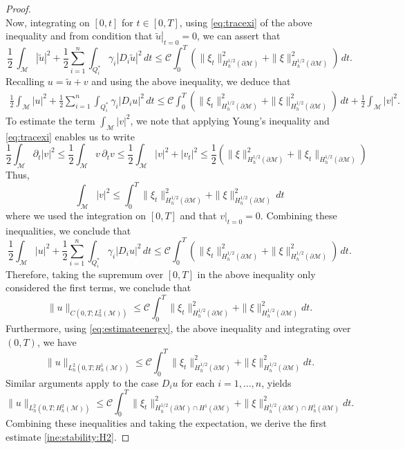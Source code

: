 \documentclass[10pt,a4paper]{amsart}
\begin{document}
\begin{proof}
\[\]
Now, integrating on $[0,t]$ for $t\in [0,T]$, using \eqref{eq:tracexi} of the above inequality and from condition that $\left.\tilde{u}\right|_{t=0}=0$, we can assert that
\begin{equation}\label{eqE}
    \frac{1}{2} \, \int_{\mathcal{M}}|\tilde{u}|^2+ \frac{1}{2}\sum_{i=1}^{n}\int_{Q_i^{*}} \gamma_i|D_i\tilde{u}|^2\, dt \leq \mathcal{C}\int_{0}^{T}\left(\|\xi_t\|^2_{ H_h^{1/2}(\partial \mathcal{M})}+\|\xi\|^2_{H_h^{1/2}(\partial \mathcal{M})}\right)\, dt.
\end{equation}
Recalling $u = \tilde{u} + v$ and using the above inequality, we deduce that
\[
\begin{aligned}
\frac{1}{2}\int_{\mathcal{M}}|u|^2+\frac{1}{2}\sum_{i=1}^{n}\int_{Q_i^{*}}\gamma_i|D_iu|^2\,dt\leq \mathcal{C}\int_{0}^{T}\left(\|\xi_t\|^2_{ H_h^{1/2}(\partial \mathcal{M})}+\|\xi\|^2_{H_h^{1/2}(\partial \mathcal{M})}\right)\, dt+\frac{1}{2}\int_{\mathcal{M}}|v|^2.
\end{aligned}
\]
To estimate the term $\displaystyle \int_{\mathcal{M}}|v|^2$, we note that applying Young's inequality and \eqref{eq:tracexi} enables us to write
\[
\frac{1}{2}\int_{\mathcal{M}}\partial_{t}|v|^2\leq \frac{1}{2}\int_{\mathcal{M}}v\,\partial_{t}v\leq \frac{1}{2}\int_{\mathcal{M}}|v|^2+|v_{t}|^2\leq \frac{1}{2}\left(\|\xi\|^2_{H^{1/2}_{h}(\partial \mathcal{M})}+\|\xi_{t}\|_{H^{1/2}_{h}(\partial\mathcal{M})}\right)  
\]
Thus, 
\[
\int_{\mathcal{M}}|v|^2\leq \int_0^{T}\|\xi_{t}\|^2_{H_{h}^{1/2}(\partial\mathcal{M})}+\|\xi\|^2_{H_{h}^{1/2}(\partial \mathcal{M})}\,dt
\]
where we used the integration on $[0,T]$ and that $\left.v\right|_{t=0}=0$.
Combining these inequalities, we conclude that
\begin{equation}\label{eq:estimateenergy}
  \frac{1}{2}\int_{\mathcal{M}}|u|^2+\frac{1}{2}\sum_{i=1}^{n}\int_{Q_i^{*}}\gamma_i|D_iu|^2\,dt\leq \mathcal{C}\int_{0}^{T}\left(\|\xi_t\|^2_{ H_h^{1/2}(\partial \mathcal{M})}+\|\xi\|^2_{H_h^{1/2}(\partial \mathcal{M})}\right)\, dt.
\end{equation}
Therefore, taking the supremum over $[0,T]$ in the above inequality only considered the first terms, we conclude that
\begin{equation*}
\|u\|_{C(0,T; L_h^2(\mathcal{M}))} \leq \mathcal{C}\int_{0}^{T} \|\xi_{t}\|^2_{H^{1/2}_{h}(\partial \mathcal{M})}+\|\xi\|^2_{H_{h}^{1/2}(\partial\mathcal{M})} dt.
\end{equation*}
Furthermore, using \eqref{eq:estimateenergy}, the above inequality and integrating over $(0,T)$, we have
\begin{equation*}
\|u\|_{L_h^2(0,T; H^1_{h}(\mathcal{M}))} \leq\mathcal{C}\int_{0}^{T} \|\xi_{t}\|^2_{H^{1/2}_{h}(\partial \mathcal{M})}+\|\xi\|^2_{H_{h}^{1/2}(\partial\mathcal{M})} dt.
\end{equation*}
Similar arguments apply to the case $D_iu$ for each $i=1,\ldots,n$, yields
\[
\|u\|_{L_h^2(0,T; H_{h}^2(\mathcal{M}))} \leq\mathcal{C}\int_{0}^{T} \|\xi_{t}\|^2_{H^{1/2}_{h}(\partial \mathcal{M})\cap H^{1}(\partial\mathcal{M})}+\|\xi\|^2_{H_{h}^{1/2}(\partial\mathcal{M})\cap H^1_{h}(\partial\mathcal{M})} dt.
\]
Combining these inequalities and taking the expectation, we derive the first estimate \eqref{ine:stability:H2}.


\end{proof}
\end{document}
